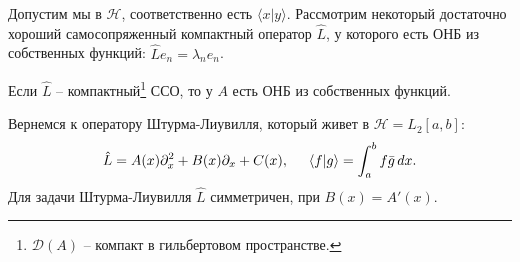 Допустим мы в $\mathcal H$, соответственно есть $\langle x | y\rangle$. Рассмотрим некоторый достаточно хороший самосопряженный компактный оператор $\hat{L}$, у которого есть ОНБ из собственных функций: $\hat{L} e_n = \lambda_n e_n$.


\begin{to_thr}
    Если $\hat{L}$ -- компактный\footnote{
        $\mathcal D (A)$ -- компакт в гильбертовом пространстве.
    }  ССО, то у $A$ есть ОНБ из собственных функций. 
\end{to_thr}

Вернемся к оператору Штурма-Лиувилля, который живет в $\mathcal H = L_2[a, b]$:
\begin{equation*}
    \hat{L} = A(x) \partial_x^2 + B(x) \partial_x + C(x),
    \hspace{5 mm} 
    \langle f|g\rangle = \int_{a}^{b} f \bar{g} \, d x.
\end{equation*}
Для задачи Штурма-Лиувилля $\hat{L}$  симметричен, при $B(x) = A'(x)$. 

